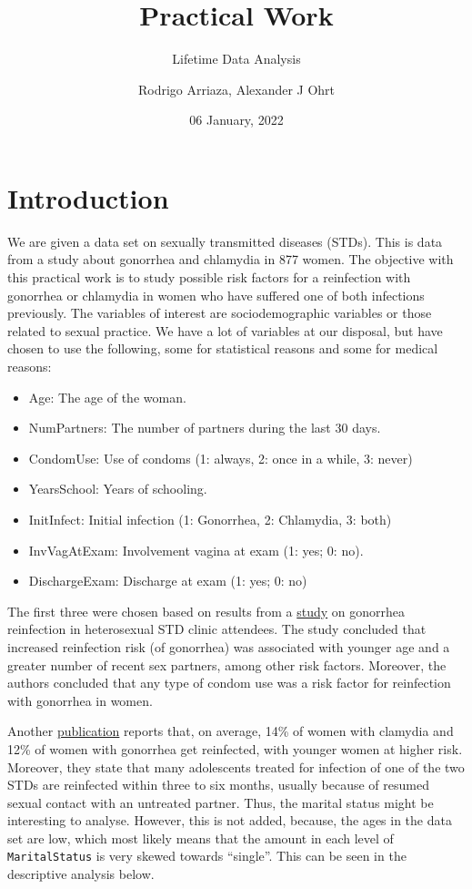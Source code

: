 \documentclass[
]{article}
\title{Practical Work}
\subtitle{Lifetime Data Analysis}
\author{Rodrigo Arriaza, Alexander J Ohrt}
\date{06 January, 2022}
\providecommand{\tightlist}{%
  \setlength{\itemsep}{0pt}\setlength{\parskip}{0pt}}
\begin{document}
\maketitle

\hypertarget{introduction}{%
\section{Introduction}\label{introduction}}

We are given a data set on sexually transmitted diseases (STDs). This is data from a study about gonorrhea and chlamydia in 877 women. The objective with this practical work is to study possible risk factors for a reinfection with gonorrhea or chlamydia in women who have suffered one of both infections previously. The variables of interest are sociodemographic variables or those related to sexual practice. We have a lot of variables at our disposal, but have chosen to use the following, some for statistical reasons and some for medical reasons:

\begin{itemize}
\tightlist
\item
  Age: The age of the woman.
\item
  NumPartners: The number of partners during the last 30 days.
\item
  CondomUse: Use of condoms (1: always, 2: once in a while, 3: never)
\item
  YearsSchool: Years of schooling.
\item
  InitInfect: Initial infection (1: Gonorrhea, 2: Chlamydia, 3: both)
\item
  InvVagAtExam: Involvement vagina at exam (1: yes; 0: no).
\item
  DischargeExam: Discharge at exam (1: yes; 0: no)
\end{itemize}

The first three were chosen based on results from a \href{https://www.ncbi.nlm.nih.gov/pmc/articles/PMC1744639/}{study} on gonorrhea reinfection in heterosexual STD clinic attendees. The study concluded that increased reinfection risk (of gonorrhea) was associated with younger age and a greater number of recent sex partners, among other risk factors. Moreover, the authors concluded that any type of condom use was a risk factor for reinfection with gonorrhea in women.

Another \href{https://policylab.chop.edu/sites/default/files/pdf/publications/Preventing_Chlamydia_Gonorrhea_Reinfection_through_Increased_Use_of_EPT.pdf}{publication} reports that, on average, 14\% of women with clamydia and 12\% of women with gonorrhea get reinfected, with younger women at higher risk. Moreover, they state that many adolescents treated for infection of one of the two STDs are reinfected within three to six months, usually because of resumed sexual contact with an untreated partner. Thus, the marital status might be interesting to analyse. However, this is not added, because, the ages in the data set are low, which most likely means that the amount in each level of \texttt{MaritalStatus} is very skewed towards ``single''. This can be seen in the descriptive analysis below.
\end{document}
